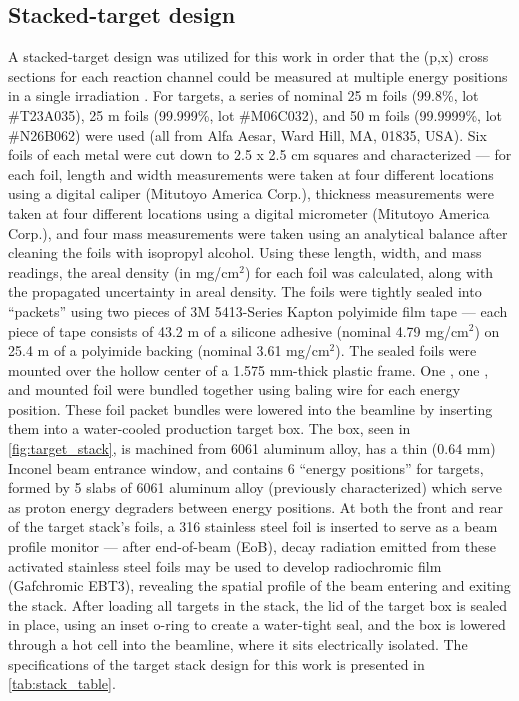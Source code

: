 \documentclass[3p]{elsarticle}
\newcommand{\comment}[1]{\todo[color=blue!20!white,inline]{ASV: #1}}
\begin{document}
\subsection{Stacked-target design }\label{sec:target_design}


A stacked-target design was utilized for this work in order that the (p,x) cross sections for each reaction channel could be measured at multiple energy positions in a single irradiation \cite{Cumming1963}. 
For targets, a series of nominal 25 \micro m  foils (99.8\%, lot \#T23A035), 25 \micro m  foils (99.999\%, lot \#M06C032), and 50 \micro m  foils (99.9999\%, lot \#N26B062) were used (all from Alfa Aesar, Ward Hill, MA, 01835, USA).
Six foils of each metal were cut down to 2.5 x 2.5 cm squares and characterized --- for each foil, length and width measurements were taken at four different locations using a digital caliper (Mitutoyo America Corp.), thickness measurements were taken at four different locations using a digital micrometer (Mitutoyo America Corp.), and four mass measurements were taken using an analytical balance after cleaning the foils with isopropyl alcohol.
Using these length, width, and mass readings, the areal density (in mg/cm$^2$) for each foil was calculated, along with the propagated uncertainty in areal density.
The foils were tightly sealed into \enquote{packets} using two pieces of  3M 5413-Series Kapton polyimide film tape --- each piece of tape consists of 43.2 \micro m of a silicone adhesive (nominal 4.79 mg/cm$^2$) on 25.4 \micro m of a polyimide backing (nominal 3.61 mg/cm$^2$).
The sealed foils were mounted over the hollow center of a 1.575 mm-thick plastic frame.
One , one , and  mounted foil were bundled together using baling wire for each energy position.
These foil packet bundles were lowered into the beamline by inserting them into a  water-cooled production target box.
The box, seen in \autoref{fig:target_stack}, is machined from 6061 aluminum alloy, has a thin (0.64 mm) Inconel beam entrance window, and  contains 6 \enquote{energy positions} for targets, formed by  5 slabs of 6061 aluminum alloy (previously characterized) which serve as proton energy degraders  between energy positions.
At both the front and rear of the target stack's foils, a 316 stainless steel foil is inserted to serve as a beam profile monitor --- after end-of-beam (EoB), decay radiation emitted from these activated stainless steel foils may be used to develop radiochromic film (Gafchromic EBT3), revealing the spatial profile of the beam entering and exiting the stack.
After loading all targets in the stack, the lid of the target box is sealed in place, using an inset o-ring to create a water-tight seal, and the box is lowered through a hot cell into the beamline, where it sits electrically isolated.
The specifications of the target stack design for this work is presented in \autoref{tab:stack_table}.
\end{document}
